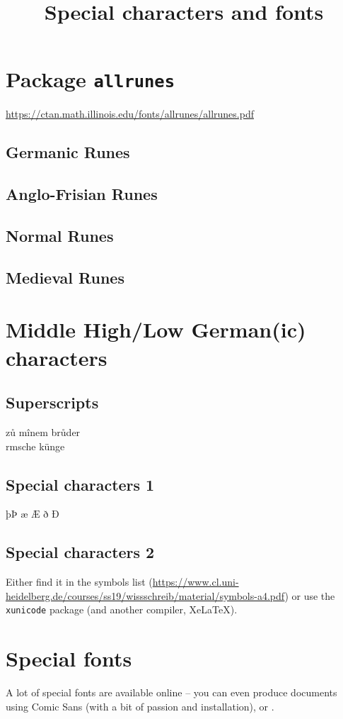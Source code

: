 \documentclass[10pt,a4paper]{article}
\title{Special characters and fonts}
\date{\vspace{-5ex}} %
\renewcommand{\sups}[2]{\textipa{\tipaUpperaccent[.2ex]{%
 			\lower.8ex\hbox{\super{#2}}}{#1}}} %
\begin{document}
\maketitle

\section{Package \texttt{allrunes}}
\url{https://ctan.math.illinois.edu/fonts/allrunes/allrunes.pdf}\par\medskip

\subsection{Germanic Runes}

\subsection{Anglo-Frisian Runes}

\subsection{Normal Runes}

\subsection{Medieval Runes}

\section{Middle High/Low German(ic) characters}

\subsection{Superscripts}
z\r{u} mînem br\r{u}der\\
r\sups{o}{e}msche k\"unge

\subsection{Special characters 1}
þÞ æ Æ ð Ð

\subsection{Special characters 2}
Either find it in the symbols list (\url{https://www.cl.uni-heidelberg.de/courses/ss19/wissschreib/material/symbols-a4.pdf}) or use the \texttt{xunicode} package (and another compiler, XeLaTeX).

\section{Special fonts}
A lot of special fonts are available online -- you can even produce documents using Comic Sans (with a bit of passion and installation), or . 
\end{document}
